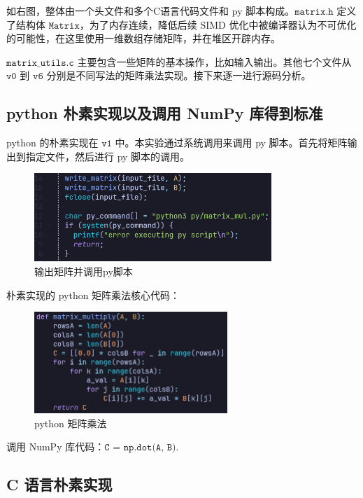 \documentclass{article}
\begin{document}
如右图，整体由一个头文件和多个C语言代码文件和 py 脚本构成。$\texttt{matrix.h}$ 定义了结构体 $\texttt{Matrix}$，为了内存连续，降低后续 SIMD 优化中被编译器认为不可优化的可能性，在这里使用一维数组存储矩阵，并在堆区开辟内存。

$\texttt{matrix\_utils.c}$ 主要包含一些矩阵的基本操作，比如输入输出。其他七个文件从 $\texttt{v0}$ 到 $\texttt{v6}$ 分别是不同写法的矩阵乘法实现。接下来逐一进行源码分析。

\subsection{python 朴素实现以及调用 NumPy 库得到标准}

python 的朴素实现在 $\texttt{v1}$ 中。本实验通过系统调用来调用 py 脚本。首先将矩阵输出到指定文件，然后进行 py 脚本的调用。

\begin{figure}[htbp]
  \centering
  \includegraphics[width=0.8\textwidth]{pics/v1code.png}
  \caption*{输出矩阵并调用py脚本}
\end{figure}

朴素实现的 python 矩阵乘法核心代码：
\begin{figure}[htbp]
  \centering
  \includegraphics[width=0.65\textwidth]{pics/python_simple.png}
  \caption*{python 矩阵乘法}
\end{figure}

调用 NumPy 库代码：$\texttt{C = np.dot(A, B)}.$

\subsection{C 语言朴素实现}
\end{document}
